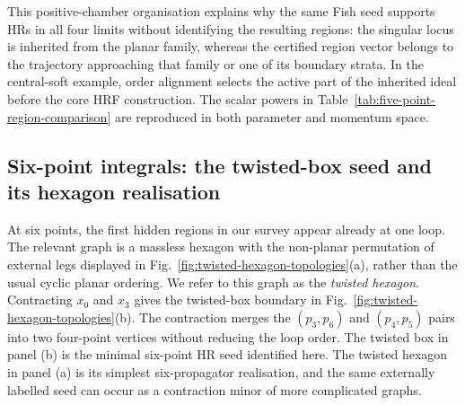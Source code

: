\documentclass[a4paper,11pt]{article}
\begin{document}
This positive-chamber organisation explains why the same Fish seed supports
HRs in all four limits without identifying the resulting regions: the
singular locus is inherited from the planar family, whereas the certified
region vector belongs to the trajectory approaching that family or one of
its boundary strata.  In the central-soft example, order alignment selects
the active part of the inherited ideal before the core HRF construction.
The scalar powers in Table~\ref{tab:five-point-region-comparison} are
reproduced in both parameter and momentum space.

\subsection{Six-point integrals: the twisted-box seed and its hexagon realisation}
\label{sec:example-alignment}

At six points, the first hidden regions in our survey appear already at one
loop.  The relevant graph is a massless hexagon with the non-planar
permutation of external legs displayed in
Fig.~\ref{fig:twisted-hexagon-topologies}(a),
rather than the usual cyclic planar ordering.  We refer to this graph as the
\emph{twisted hexagon}.  Contracting \(x_0\) and \(x_3\) gives the twisted-box
boundary in Fig.~\ref{fig:twisted-hexagon-topologies}(b).  The contraction
merges the \((p_3,p_6)\) and \((p_4,p_5)\) pairs into two four-point vertices
without reducing the loop order.  The twisted box in panel (b) is the minimal
six-point HR seed identified here.  The twisted hexagon in panel (a) is its
simplest six-propagator realisation, and the same externally labelled seed can
occur as a contraction minor of more complicated graphs.
\end{document}
